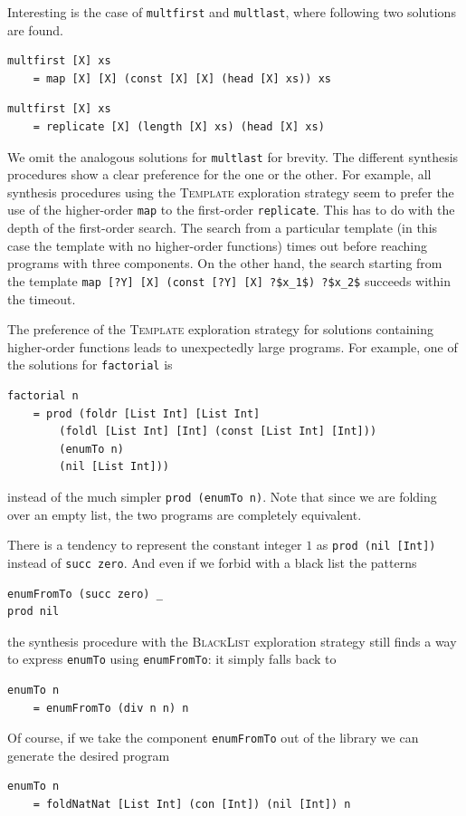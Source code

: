 Interesting is the case of \lstinline?multfirst? and \lstinline?multlast?, where following two solutions are found.
\begin{lstlisting}
multfirst [X] xs
    = map [X] [X] (const [X] [X] (head [X] xs)) xs
\end{lstlisting}
\begin{lstlisting}
multfirst [X] xs
    = replicate [X] (length [X] xs) (head [X] xs)
\end{lstlisting}
We omit the analogous solutions for \lstinline!multlast! for brevity.
The different synthesis procedures show a clear preference for the one or the other. For example, all synthesis procedures using the \textsc{Template} exploration strategy seem to prefer the use of the higher-order \lstinline?map? to the first-order \lstinline?replicate?. This has to do with the depth of the first-order search. The search from a particular template (in this case the template with no higher-order functions) times out before reaching programs with three components. On the other hand, the search starting from the template \lstinline!map [?Y] [X] (const [?Y] [X] ?$x_1$) ?$x_2$! succeeds within the timeout.

The preference of the \textsc{Template} exploration strategy for solutions containing higher-order functions leads to unexpectedly large programs. For example, one of the solutions for \lstinline?factorial? is
\begin{lstlisting}
factorial n
    = prod (foldr [List Int] [List Int]
        (foldl [List Int] [Int] (const [List Int] [Int]))
        (enumTo n)
        (nil [List Int]))
\end{lstlisting}
instead of the much simpler \lstinline?prod (enumTo n)?. Note that since we are folding over an empty list, the two programs are completely equivalent.

There is a tendency to represent the constant integer $1$ as \lstinline?prod (nil [Int])? instead of \lstinline?succ zero?. And even if we forbid with a black list the patterns
\begin{lstlisting}
enumFromTo (succ zero) _
prod nil
\end{lstlisting}
the synthesis procedure with the \textsc{BlackList} exploration strategy still finds a way to express \lstinline?enumTo? using \lstinline?enumFromTo?: it simply falls back to 
\begin{lstlisting}
enumTo n
    = enumFromTo (div n n) n
\end{lstlisting}
Of course, if we take the component \lstinline?enumFromTo? out of the library we can generate the desired program
\begin{lstlisting}
enumTo n
    = foldNatNat [List Int] (con [Int]) (nil [Int]) n
\end{lstlisting}

